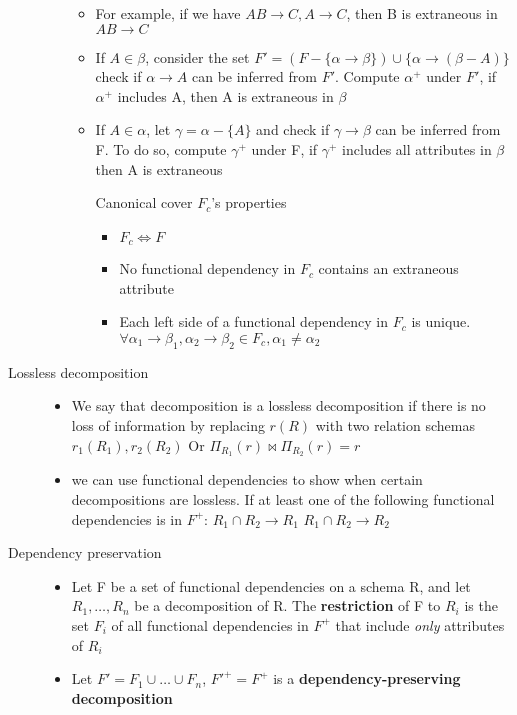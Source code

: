 \documentclass[11pt]{article}
\begin{document}
\begin{description}
\begin{itemize}
\begin{itemize}
\item For example, if we have $AB\to C, A\to C$, then B is extraneous in $AB\to C$
\item If $A\in\beta$, consider the set $F'=(F-\{\alpha\to\beta\})\cup\{\alpha\to(\beta-A)\}$
         check if $\alpha\to A$ can be inferred from $F'$. Compute $\alpha^+$ under $F'$, if $\alpha^+$
         includes A, then A is extraneous in $\beta$
\item If $A\in\alpha$, let $\gamma=\alpha-\{A\}$ and check if $\gamma\to\beta$ can be inferred from F.
To do so, compute $\gamma^+$ under F, if $\gamma^+$ includes all attributes in $\beta$
then A is extraneous
\item[{Canonical cover $F_c$'s properties}] \begin{itemize}
\item $F_c\Leftrightarrow F$
\item No functional dependency in $F_c$ contains an extraneous attribute
\item Each left side of a functional dependency in $F_c$ is unique.
$\forall \alpha_1\to\beta_1, \alpha_2\to\beta_2\in F_c,\alpha_1\neq\alpha_2$
\end{itemize}
\end{itemize}
\end{itemize}
\item[{Lossless decomposition}] \begin{itemize}
\item We say that decomposition is a lossless decomposition if there is no loss
of information by replacing $r(R)$ with two relation schemas $r_1(R_1),r_2(R_2)$
Or $\Pi_{R_1}(r)\bowtie\Pi_{R_2}(r)=r$
\item we can use functional dependencies to show when certain decompositions are lossless.
If at least one of the following functional dependencies is in $F^+$:
$R_1\cap R_2\to R_1$
$R_1\cap R_2\to R_2$
\end{itemize}
\item[{Dependency preservation}] \begin{itemize}
\item Let F be a set of functional dependencies on a schema R, and let $R_1, \dots,R_n$ be
a decomposition of R. The \textbf{restriction} of F to $R_i$ is the set $F_i$ of all functional
dependencies in $F^+$ that include \emph{only} attributes of $R_i$
\item Let $F'=F_1\cup\dots\cup F_n$, $F'^+=F^+$ is a \textbf{dependency-preserving decomposition}
\end{itemize}
\end{description}
\end{document}
